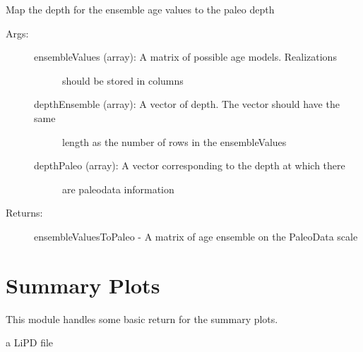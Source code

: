 \documentclass[letterpaper,10pt,english]{sphinxmanual}
\begin{document}

\begin{fulllineitems}
\label{\detokenize{LipdUtils:pyleoclim.LipdUtils.mapAgeEnsembleToPaleoData}}
Map the depth for the ensemble age values to the paleo depth
\begin{description}
\item[{Args:}] \leavevmode\begin{description}
\item[{ensembleValues (array): A matrix of possible age models. Realizations}] \leavevmode
should be stored in columns

\item[{depthEnsemble (array): A vector of depth. The vector should have the same}] \leavevmode
length as the number of rows in the ensembleValues

\item[{depthPaleo (array): A vector corresponding to the depth at which there}] \leavevmode
are paleodata information

\end{description}

\item[{Returns:}] \leavevmode
ensembleValuesToPaleo - A matrix of age ensemble on the PaleoData scale

\end{description}

\end{fulllineitems}



\chapter{Summary Plots}
\label{\detokenize{SummaryPlots:summary-plots}}\label{\detokenize{SummaryPlots::doc}}
This module handles some basic return for the summary plots.

 a LiPD file
\end{document}
